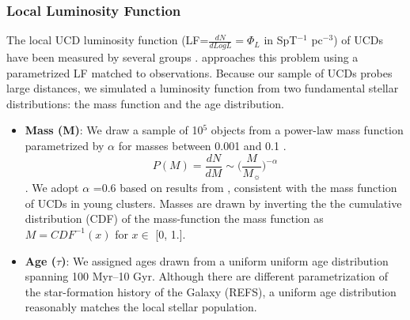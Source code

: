 \documentclass[manuscript]{aastex63}
\begin{document}
\subsubsection{ Local Luminosity Function}
The local UCD luminosity function (LF=$\frac{dN}{dLog L}= \Phi_L$ in SpT$^{-1}$ pc$^{-3}$) of UCDs have been measured by several groups \citep{2003AJ....126.2449R,2007astro.ph..2034C,2010AJ....139.2679B,2008ApJ...676.1281M,Reyle2010a,2019ApJS..240...19K,2019arXiv190604166B}. \cite{2016AJ....151...92R} approaches this problem using a parametrized LF matched to observations. Because our sample of UCDs probes large distances, we simulated a luminosity function from two fundamental stellar distributions: the mass function and the age distribution. 

\begin{itemize}
\item \textbf{Mass (M)}: We draw a sample of 10$^5$ objects from a power-law mass function parametrized by $\alpha$ for masses between 0.001 \Msun and 0.1 \Msun. \begin{equation}  P(M) = \frac{dN}{dM} \sim \biggl( \frac{M}{M_\sun}\biggl)^{-\alpha}\end{equation}. We adopt $\alpha$ =0.6 based on results from \cite{2019ApJS..240...19K}, consistent with the mass function of UCD{}s in young clusters. Masses are drawn by inverting the the cumulative distribution (CDF) of the mass-function the mass function as $M= CDF^{-1} (x) $ for $x \in$ [0, 1.]. 

\item \textbf{Age ($\tau$)}: We assigned ages drawn from a uniform uniform age distribution spanning 100 Myr--10 Gyr. Although there are different parametrization of the star-formation history of the Galaxy (REFS), a uniform age distribution reasonably matches the local stellar population. 


\end{itemize}
\end{document}
